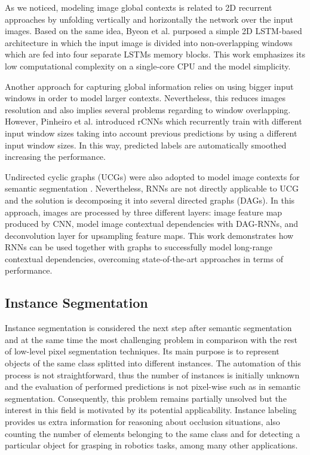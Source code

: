 As we noticed, modeling image global contexts is related to 2D recurrent approaches by unfolding vertically and horizontally the network over the input images. Based on the same idea, Byeon et al. \cite{Byeon2015} purposed a simple 2D \ac{LSTM}-based architecture in which the input image is divided into non-overlapping windows which are fed into four separate \acp{LSTM} memory blocks. This work emphasizes its low computational complexity on a single-core CPU and the model simplicity. 

Another approach for capturing global information relies on using bigger input windows in order to model larger contexts. Nevertheless, this reduces images resolution and also implies several problems regarding to window overlapping. However, Pinheiro et al. \cite{Pinheiro2014} introduced \acp{rCNN} which recurrently train with different input window sizes taking into account previous predictions by using a different input window sizes. In this way, predicted labels are automatically smoothed increasing the performance.

Undirected cyclic graphs (UCGs) were also adopted to model image contexts for semantic segmentation \cite{Shuai2015}. Nevertheless, \acp{RNN} are not directly applicable to UCG and the solution is decomposing it into several directed graphs (DAGs). In this approach, images are processed by three different layers: image feature map produced by \acs{CNN}, model image contextual dependencies with DAG-RNNs, and deconvolution layer for upsampling feature maps. This work demonstrates how \acp{RNN} can be used together with graphs to successfully model long-range contextual dependencies, overcoming state-of-the-art approaches in terms of performance.

\subsection{Instance Segmentation}

Instance segmentation is considered the next step after semantic segmentation and at the same time the most challenging problem in comparison with the rest of low-level pixel segmentation techniques. Its main purpose is to represent objects of the same class splitted into different instances. The automation of this process is not straightforward, thus the number of instances is initially unknown and the evaluation of performed predictions is not pixel-wise such as in semantic segmentation. Consequently, this problem remains partially unsolved but the interest in this field is motivated by its potential applicability. Instance labeling provides us extra information for reasoning about occlusion situations, also counting the number of elements belonging to the same class and for detecting a particular object for grasping in robotics tasks, among many other applications.

